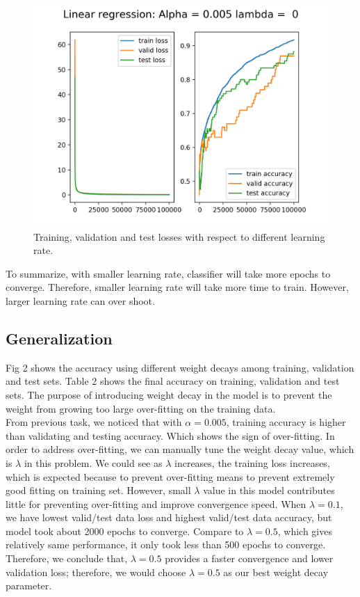 \documentclass[10pt,letterpaper]{article}
\begin{document}
\begin{figure}[H]
\begin{subfig}
  \includegraphics[width=.5\linewidth]{Linear_regression_overfitting.png}
  \caption{Training, validation and test losses with respect to different learning rate.}
  \end{subfig}
\end{figure}
 


To summarize, with smaller learning rate, classifier will take more epochs to converge. Therefore, smaller learning rate will take more time to train. However, larger learning rate can over shoot.


\subsection{Generalization}

\qquad Fig 2 shows the accuracy using different weight decays among training, validation and test sets. Table 2 shows the final accuracy on training, validation and test sets. The purpose of introducing weight decay in the model is to prevent the weight from growing too large over-fitting on the training data. \\

From previous task, we noticed that with $\alpha = 0.005$, training accuracy is higher than validating and testing accuracy. Which shows the sign of over-fitting. In order to address over-fitting, we can manually tune the weight decay value, which is $\lambda$ in this problem. We could see as $\lambda$ increases, the training loss increases, which is expected because to prevent over-fitting means to prevent extremely good fitting on training set. However, small $\lambda$ value in this model contributes little for preventing over-fitting and improve convergence speed. When $\lambda = 0.1$, we have lowest valid/test data loss and highest valid/test data accuracy, but model took about 2000 epochs to converge. Compare to $\lambda = 0.5$, which gives relatively same performance, it only took less than 500 epochs to converge. Therefore, we conclude that, $\lambda = 0.5$ provides a faster convergence and lower validation loss; therefore, we would choose $\lambda = 0.5$ as our best weight decay parameter.\\
\end{document}
